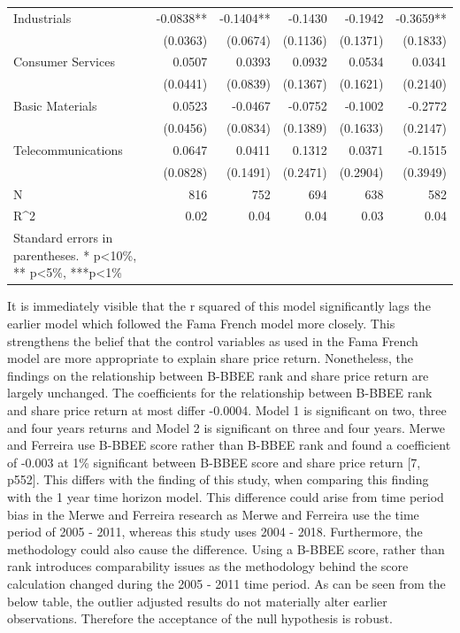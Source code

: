 \begin{table}[H]
{\begin{tabular}{lrrrrr}
Industrials        & -0.0838** & -0.1404** & -0.1430   & -0.1942   & -0.3659**  \\
                   & (0.0363)  & (0.0674)  & (0.1136)  & (0.1371)  & (0.1833)   \\
Consumer Services  & 0.0507    & 0.0393    & 0.0932    & 0.0534    & 0.0341     \\
                   & (0.0441)  & (0.0839)  & (0.1367)  & (0.1621)  & (0.2140)   \\
Basic Materials    & 0.0523    & -0.0467   & -0.0752   & -0.1002   & -0.2772    \\
                   & (0.0456)  & (0.0834)  & (0.1389)  & (0.1633)  & (0.2147)   \\
Telecommunications & 0.0647    & 0.0411    & 0.1312    & 0.0371    & -0.1515    \\
                   & (0.0828)  & (0.1491)  & (0.2471)  & (0.2904)  & (0.3949)   \\
N                  & 816       & 752       & 694       & 638       & 582        \\
R^2                 & 0.02      & 0.04      & 0.04      & 0.03      & 0.04       \\
   \bottomrule
Standard errors in parentheses.
* p<10\%, ** p<5\%, ***p<1\%
\end{tabular}}
\end{table} 

It is immediately visible that the r squared of this model significantly lags the earlier model which followed the Fama French model more closely. This strengthens the belief that the control variables as used in the Fama French model are more appropriate to explain share price return. Nonetheless, the findings on the relationship between B-BBEE rank and share price return are largely unchanged. The coefficients for the relationship between B-BBEE rank and share price return at most differ -0.0004. Model 1 is significant on two, three and four years returns and Model 2  is significant on three  and four years. Merwe and Ferreira use B-BBEE score rather than B-BBEE rank and found a coefficient of -0.003 at 1\% significant between B-BBEE score and share price return [7, p552]. This differs with the finding of this study, when comparing this finding with the 1 year time horizon model. This difference could arise from time period bias in the Merwe and Ferreira research as Merwe and Ferreira use the time period of 2005 - 2011, whereas this study uses 2004 - 2018. Furthermore, the methodology could also cause the difference. Using a B-BBEE score, rather than rank introduces comparability issues as the methodology behind the score calculation changed during the 2005 - 2011 time period. As can be seen from the below table, the outlier adjusted results do not materially alter earlier observations. Therefore the acceptance of the null hypothesis is robust.

